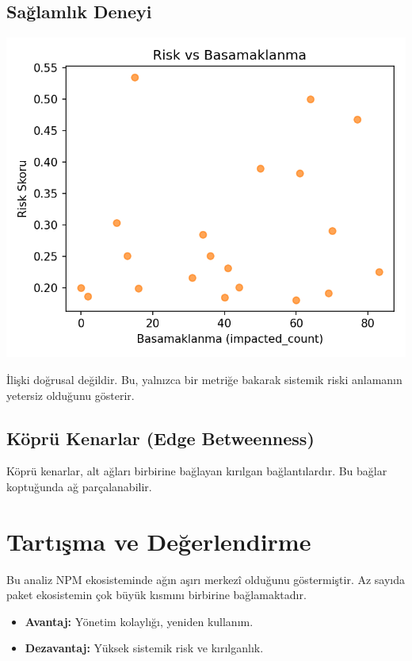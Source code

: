 \documentclass[11pt,a4paper]{article}
\begin{document}
\subsection{Sağlamlık Deneyi}
\includegraphics{risk_vs_cascade.png}
\begin{tipbox}
İlişki doğrusal değildir. Bu, yalnızca bir metriğe bakarak sistemik riski anlamanın yetersiz olduğunu gösterir.
\end{tipbox}


\subsection{Köprü Kenarlar (Edge Betweenness)}
\begin{tipbox}
Köprü kenarlar, alt ağları birbirine bağlayan kırılgan bağlantılardır. Bu bağlar koptuğunda ağ parçalanabilir.
\end{tipbox}
\section{Tartışma ve Değerlendirme}
Bu analiz NPM ekosisteminde ağın aşırı merkezî olduğunu göstermiştir. 
Az sayıda paket ekosistemin çok büyük kısmını birbirine bağlamaktadır.

\begin{itemize}
  \item \textbf{Avantaj:} Yönetim kolaylığı, yeniden kullanım.
  \item \textbf{Dezavantaj:} Yüksek sistemik risk ve kırılganlık.
\end{itemize}
\end{document}

